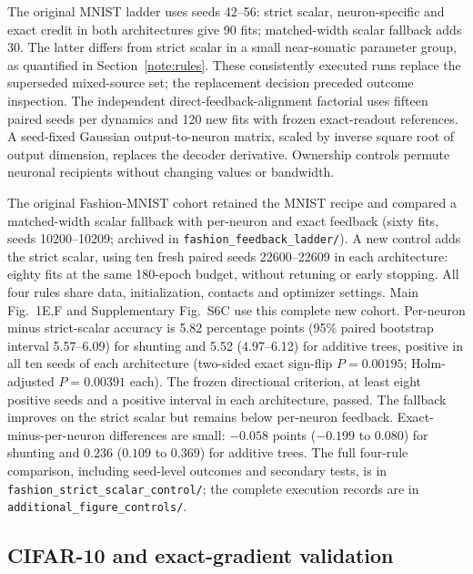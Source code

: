 The original MNIST ladder uses seeds 42--56: strict scalar, neuron-specific and exact credit in both architectures give 90 fits; matched-width scalar fallback adds 30. The latter differs from strict scalar in a small near-somatic parameter group, as quantified in Section~\ref{note:rules}. These consistently executed runs replace the superseded mixed-source set; the replacement decision preceded outcome inspection. The independent direct-feedback-alignment factorial uses fifteen paired seeds per dynamics and 120 new fits with frozen exact-readout references. A seed-fixed Gaussian output-to-neuron matrix, scaled by inverse square root of output dimension, replaces the decoder derivative. Ownership controls permute neuronal recipients without changing values or bandwidth.

The original Fashion-MNIST cohort retained the MNIST recipe and compared a matched-width scalar fallback with per-neuron and exact feedback (sixty fits, seeds 10200--10209; archived in \texttt{fashion\_feedback\_ladder/}). A new control adds the strict scalar, using ten fresh paired seeds 22600--22609 in each architecture: eighty fits at the same 180-epoch budget, without retuning or early stopping. All four rules share data, initialization, contacts and optimizer settings. Main Fig.~1E,F and Supplementary Fig.~S6C use this complete new cohort. Per-neuron minus strict-scalar accuracy is 5.82 percentage points (95\% paired bootstrap interval 5.57--6.09) for shunting and 5.52 (4.97--6.12) for additive trees, positive in all ten seeds of each architecture (two-sided exact sign-flip $P=0.00195$; Holm-adjusted $P=0.00391$ each). The frozen directional criterion, at least eight positive seeds and a positive interval in each architecture, passed. The fallback improves on the strict scalar but remains below per-neuron feedback. Exact-minus-per-neuron differences are small: $-0.058$ points ($-0.199$ to $0.080$) for shunting and $0.236$ ($0.109$ to $0.369$) for additive trees. The full four-rule comparison, including seed-level outcomes and secondary tests, is in \texttt{fashion\_strict\_scalar\_control/}; the complete execution records are in \texttt{additional\_figure\_controls/}.

\subsection{CIFAR-10 and exact-gradient validation}


